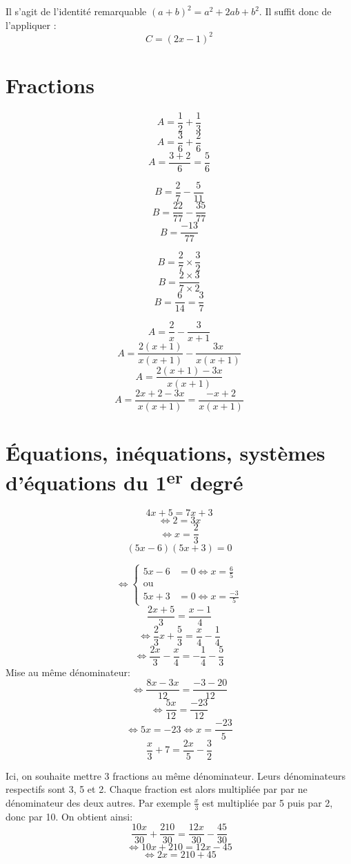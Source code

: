 \documentclass[a4paper,11pt]{scrartcl}
\begin{document}
Il s'agit de l'identité remarquable $(a+b)^2 = a^2 + 2ab + b^2$. Il suffit donc de l'appliquer :
$$C = (2x-1)^2$$



\section*{Fractions}


$$A = \frac{1}{2} + \frac{1}{3}$$
$$A = \frac{3}{6} + \frac{2}{6}$$
$$A = \frac{3+2}{6} = \frac{5}{6}$$

\trait

$$B = \frac{2}{7} - \frac{5}{11}$$
$$B = \frac{22}{77} - \frac{35}{77}$$
$$B = \frac{-13}{77}$$

\trait

$$B = \frac{2}{7} \times \frac{3}{2}$$
$$B = \frac{2 \times 3}{7 \times 2}$$
$$B = \frac{6}{14}  = \frac{3}{7}$$


\trait

$$A = \frac{2}{x} - \frac{3}{x+1}$$
$$A = \frac{2(x+1)}{x(x+1)} - \frac{3x}{x(x+1)}$$
$$A = \frac{2(x+1) - 3x}{x(x+1)}$$
$$A = \frac{2x+2 - 3x}{x(x+1)} = \frac{-x+2}{x(x+1)}$$


\section*{Équations, inéquations, systèmes d'équations du 1\textsuperscript{er} degré}



$$4x+5 = 7x+3$$
$$\Leftrightarrow 2 = 3x$$
$$\Leftrightarrow x = \frac{2}{3}$$
\trait
$$(5x-6)(5x+3) = 0$$

$$\Leftrightarrow 
\begin{cases}
5x-6 &= 0 \Leftrightarrow x = \frac{6}{5}\\ 
\mbox{ou}\\
5x+3 &= 0 \Leftrightarrow x = \frac{-3}{5}
\end{cases}$$
\trait
$$\frac{2x+5}{3} = \frac{x-1}{4}$$
$$\Leftrightarrow \frac{2}{3}x + \frac{5}{3} = \frac{x}{4} - \frac{1}{4}$$
$$\Leftrightarrow \frac{2x}{3} - \frac{x}{4} = - \frac{1}{4} - \frac{5}{3}$$
Mise au même dénominateur:
$$\Leftrightarrow \frac{8x - 3x}{12} = \frac{-3 - 20}{12}$$
$$\Leftrightarrow \frac{5x}{12} = \frac{-23}{12}$$
$$\Leftrightarrow 5x = -23 \Leftrightarrow x = \frac{-23}{5}$$
\trait
$$\frac{x}{3} + 7 = \frac{2x}{5} - \frac{3}{2}$$

Ici, on souhaite mettre 3 fractions au même dénominateur. Leurs dénominateurs respectifs sont 3, 5 et 2. Chaque fraction est alors multipliée par par ne dénominateur des deux autres. Par exemple $\frac{x}{3}$ est multipliée par 5 puis par 2, donc par 10. On obtient ainsi:
$$\frac{10x}{30} + \frac{210}{30} = \frac{12x}{30} - \frac{45}{30}$$
$$\Leftrightarrow 10x + 210 = 12x - 45$$
$$\Leftrightarrow 2x = 210+ 45$$
\end{document}
